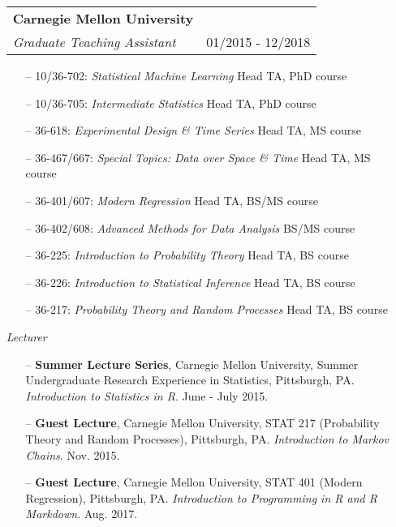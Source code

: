 \documentclass[letterpaper,10pt]{article}
\makeatletter
\newcommand{\subheadingtwo}[4]{
\begin{tabular*}{6.45in}{l@{\cftdotfill{\cftsecdotsep}\extracolsep{\fill}}r}
\textbf{#1} & #2 \\
#3 & {#4} \\
\end{tabular*}}
\makeatother
\begin{document}
\begin{itemize}[leftmargin=0.4cm]

\item[] \subheadingtwo{Carnegie Mellon University}{}{\it Graduate Teaching Assistant}{01/2015 - 12/2018}

\begin{itemize}
\item[--]10/36-702: \hspace{1.5ex}\emph{Statistical Machine Learning} \hfill Head TA, PhD course
\item[--]10/36-705: \hspace{0.5ex} \emph{Intermediate Statistics} \hfill Head TA, PhD course
\item[--]36-618: \hspace{5ex}\emph{Experimental Design \& Time Series} \hfill Head TA, MS course
\item[--]36-467/667:\hspace{0.25ex}  \emph{Special Topics: Data over Space \& Time} \hfill Head TA, MS course
\item[--]36-401/607: \hspace{0.25ex}\emph{Modern Regression} \hfill Head TA, BS/MS course
\item[--]36-402/608: \hspace{0.25ex}\emph{Advanced Methods for Data Analysis} \hfill BS/MS course
\item[--]36-225: \hspace{5ex}\emph{Introduction to Probability Theory} \hfill Head TA, BS course
\item[--]36-226: \hspace{5ex}\emph{Introduction to Statistical Inference} \hfill Head TA, BS course
\item[--]36-217: \hspace{5ex}\emph{Probability Theory and Random Processes} \hfill Head TA, BS course
\vspace{-.1cm}
\end{itemize}

\vspace{0.1cm}

\item[] {\it Lecturer} 

\begin{itemize}
\item[--] {\bf Summer Lecture Series}, Carnegie Mellon University, Summer Undergraduate Research Experience in Statistics, Pittsburgh, PA. {\it Introduction to Statistics in R}. June - July 2015.
\item[--] {\bf Guest Lecture}, Carnegie Mellon University, STAT 217 (Probability Theory and Random Processes), Pittsburgh, PA. {\it Introduction to Markov Chains}. Nov. 2015.
\item[--] {\bf Guest Lecture}, Carnegie Mellon University, STAT 401 (Modern Regression), Pittsburgh, PA. {\it Introduction to Programming in R and R Markdown}. Aug. 2017.
\end{itemize}


\end{itemize}
\end{document}
